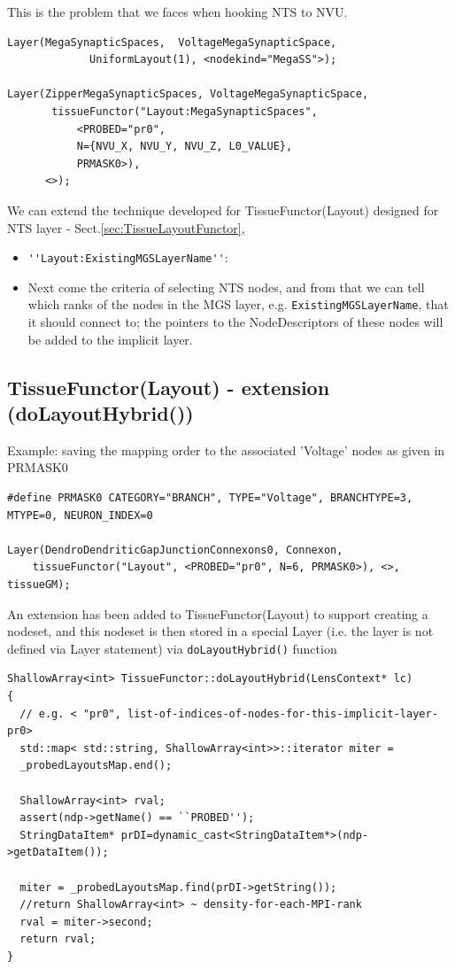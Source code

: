 This is the problem that we faces when hooking NTS to NVU. 

\begin{verbatim}
Layer(MegaSynapticSpaces,  VoltageMegaSynapticSpace,
             UniformLayout(1), <nodekind="MegaSS">);

Layer(ZipperMegaSynapticSpaces, VoltageMegaSynapticSpace,
       tissueFunctor("Layout:MegaSynapticSpaces",
           <PROBED="pr0", 
           N={NVU_X, NVU_Y, NVU_Z, L0_VALUE},
           PRMASK0>),
      <>);
\end{verbatim}

We can extend the technique developed for TissueFunctor(Layout) designed for NTS 
layer - Sect.\ref{sec:TissueLayoutFunctor}, 
\begin{itemize}
  \item \verb!''Layout:ExistingMGSLayerName''!: 
  
  
  \item Next come the criteria of selecting NTS nodes, and from that we can tell
  which ranks of the nodes in the MGS layer, e.g. \verb!ExistingMGSLayerName!, 
  that it should connect to; the pointers to the NodeDescriptors of these nodes
  will be added to the implicit layer.
  
\end{itemize}

\subsection{TissueFunctor(Layout) - extension (doLayoutHybrid())}
\label{sec:TissueLayoutFunctor-extension}

Example: saving the mapping order to the associated 'Voltage' nodes as given in
PRMASK0
{\tiny
\begin{verbatim}
#define PRMASK0 CATEGORY="BRANCH", TYPE="Voltage", BRANCHTYPE=3, MTYPE=0, NEURON_INDEX=0

Layer(DendroDendriticGapJunctionConnexons0, Connexon, 
    tissueFunctor("Layout", <PROBED="pr0", N=6, PRMASK0>), <>, tissueGM);
\end{verbatim}
}

An extension has been added to TissueFunctor(Layout) to support creating a
nodeset, and this nodeset is then stored in a special Layer (i.e. the layer is
not defined via Layer statement) via \verb!doLayoutHybrid()! function

{\tiny
\begin{verbatim}
ShallowArray<int> TissueFunctor::doLayoutHybrid(LensContext* lc)
{
  // e.g. < "pr0", list-of-indices-of-nodes-for-this-implicit-layer-pr0>
  std::map< std::string, ShallowArray<int>>::iterator miter =
  _probedLayoutsMap.end();
  
  ShallowArray<int> rval;
  assert(ndp->getName() == ``PROBED'');
  StringDataItem* prDI=dynamic_cast<StringDataItem*>(ndp->getDataItem());
  
  miter = _probedLayoutsMap.find(prDI->getString());
  //return ShallowArray<int> ~ density-for-each-MPI-rank
  rval = miter->second;
  return rval;
}
\end{verbatim}
}

